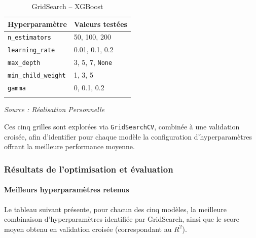 \documentclass[a4paper,12pt, oneside]{article}
\begin{document}
\begin{longtable}{|p{5cm}|p{12cm}|}
\hline
\textbf{Hyperparamètre} & \textbf{Valeurs testées} \\
\hline


\texttt{n\_estimators} & 50, 100, 200 \\
\hline
\texttt{learning\_rate} & 0.01, 0.1, 0.2 \\
\hline
\texttt{max\_depth} & 3, 5, 7, \texttt{None} \\
\hline
\texttt{min\_child\_weight} & 1, 3, 5 \\
\hline
\texttt{gamma} & 0, 0.1, 0.2 \\
\hline
\caption{GridSearch -- XGBoost} \\
\end{longtable}
\begin{center}
\vspace{-0.85cm}
\textit{Source : Réalisation Personnelle}
\end{center}

Ces cinq grilles sont explorées via \texttt{GridSearchCV}, combinée à une validation croisée, afin d'identifier pour chaque modèle la configuration d'hyperparamètres offrant la meilleure performance moyenne.

\subsubsection{Résultats de l'optimisation et évaluation}

\paragraph{Meilleurs hyperparamètres retenus\\}
Le tableau suivant présente, pour chacun des cinq modèles, la meilleure combinaison d'hyperparamètres identifiée par GridSearch, ainsi que le score moyen obtenu en validation croisée (correspondant au $R^2$).
\end{document}
